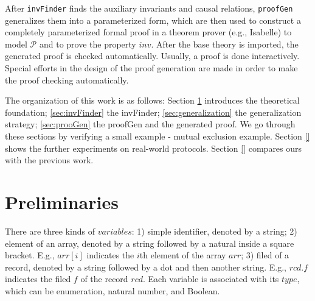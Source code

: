 \documentclass[final]{IEEEtran}
\begin{document}
After {\tt invFinder} finds the auxiliary invariants and causal relations, {\tt proofGen} generalizes them  into a parameterized form, which are then used to construct a completely parameterized formal proof in a theorem prover (e.g., Isabelle) to model $\mathcal{P}$ and to prove the property $inv$. After the base theory is imported, the generated proof is checked automatically.  Usually, a proof is done interactively. Special efforts in the design of the proof generation are made in order to make the proof checking automatically. %

The organization of this work is as follows: Section \ref{sec:Preliminaries} introduces the theoretical foundation; \ref{sec:invFinder} the {\sf invFinder}; \ref{sec:generalization} the generalization strategy; \ref{sec:prooGen} the {\sf proofGen} and the generated proof. We go through these sections by verifying a small example - mutual exclusion example. Section \ref{} shows the further experiments on real-world protocols. Section \ref{} compares ours with the previous work.

\section{Preliminaries}\label{sec:Preliminaries}
\vspace{-0.3cm}
There are three kinds of $variables$:
1) simple identifier, denoted by a string;
2) element of an array, denoted by a string followed by a natural inside a square bracket. E.g., $arr[i]$ indicates the $i$th element of the array $arr$;
3) filed of a record, denoted by a string followed by a dot and then another string. E.g., $rcd.f$ indicates the filed $f$ of the record $rcd$.
Each variable is associated with its $type$, which can be enumeration, natural number, and Boolean.

\end{document}
